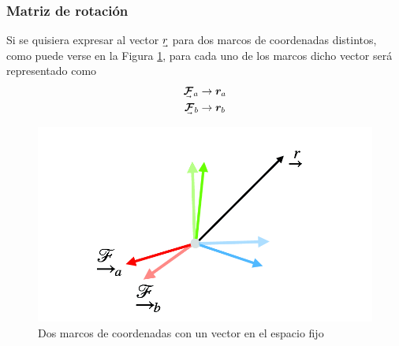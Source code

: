 \subsubsection{Matriz de rotación}
Si se quisiera expresar al vector $\undervec{r}$ para dos marcos de coordenadas distintos, como puede verse en la Figura \ref{fig:rotatedcoordinateframes}, para cada uno de los marcos dicho vector será representado como
\begin{align}
    \undervec{\bm{\mathcal{F}}}_a &\rightarrow \bm{r}_a \\
    \undervec{\bm{\mathcal{F}}}_b &\rightarrow \bm{r}_b
\end{align}
\begin{figure}
    \centering
    \includegraphics[width=\textwidth]{Img/RotatedCoordinateFrames.png}
    \caption{Dos marcos de coordenadas con un vector en el espacio fijo}
    \label{fig:rotatedcoordinateframes}
\end{figure}

